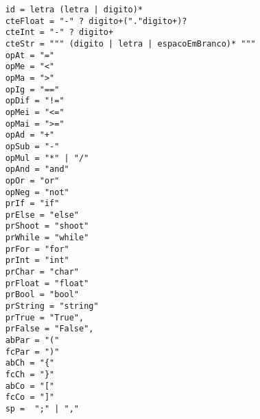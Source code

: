 \documentclass[a4paper, 12pt, article]{memoir}
\begin{document}
\begin{lstlisting}
	id = letra (letra | digito)*
	cteFloat = "-" ? digito+("."digito+)?
	cteInt = "-" ? digito+
	cteStr = """ (digito | letra | espacoEmBranco)* """
	opAt = "="
	opMe = "<"
	opMa = ">"
	opIg = "=="
	opDif = "!="
	opMei = "<="
	opMai = ">="
	opAd = "+"
	opSub = "-"
	opMul = "*" | "/"
	opAnd = "and" 
	opOr = "or" 
	opNeg = "not"
	prIf = "if"
	prElse = "else"
	prShoot = "shoot"
	prWhile = "while"
	prFor = "for"
	prInt = "int"
	prChar = "char"
	prFloat = "float"
	prBool = "bool"
	prString = "string"
	prTrue = "True",
	prFalse = "False",
	abPar = "("
	fcPar = ")"
	abCh = "{"
	fcCh = "}"
	abCo = "["
	fcCo = "]"
	sp =  ";" | "," 
\end{lstlisting}
\end{document}
